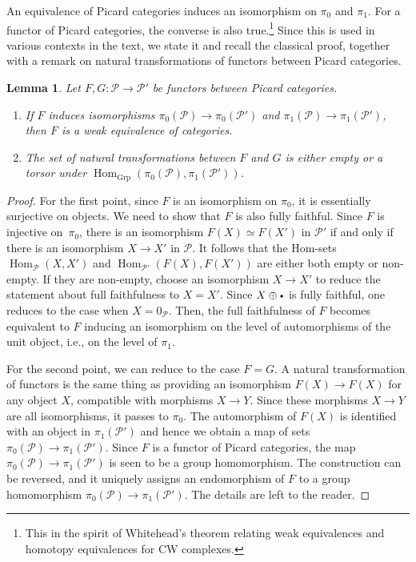 \documentclass[11pt]{article}
\newcommand{\ie}{i.e.,\xspace}
\newcommand{\sbullet}{{\scriptscriptstyle\bullet}}
\newcommand{\csbullet}{{\raisebox{1pt}{$\sbullet$}}}
\theoremstyle{plain}
\newtheorem{lemma}[theorem]{Lemma}
\theoremstyle{definition}
\newcommand{\Pcal}{\mathcal P}
\DeclareMathOperator{\Hom}{Hom}
\begin{document}
An equivalence of Picard categories induces an isomorphism on $\pi_0$ and $\pi_1$. For a functor of Picard categories, the converse is also true.\footnote{This in the spirit of Whitehead's theorem relating weak equivalences and homotopy equivalences for CW complexes.} Since this is used in various contexts in the text, we state it and recall the classical proof, together with a remark on natural transformations of functors between Picard categories.
\begin{lemma}\label{lemma:isoPicard}
Let $F, G: \Pcal \to \Pcal'$ be functors between Picard categories.
\begin{enumerate}
\item If $F$ induces isomorphisms $\pi_0(\Pcal) \to \pi_0(\Pcal')$ and $\pi_1(\Pcal) \to \pi_1(\Pcal')$, then $F$ is a weak equivalence of categories.
\item The set of natural transformations between $F$ and $G$ is either empty or a torsor under $\Hom_{\mathrm{Grp}}(\pi_0(\Pcal), \pi_1(\Pcal'))$.
\end{enumerate}
\end{lemma}
\begin{proof}
For the first point, since $F$ is an isomorphism on $\pi_0$, it is essentially surjective on objects. We need to show that $F$ is also fully faithful. Since $F$ is injective on~$\pi_0$, there is an isomorphism $F(X) \simeq F(X')$ in $\Pcal'$ if and only if there is an isomorphism $X\to X'$ in $\Pcal$. It follows that the Hom-sets $\Hom_{\Pcal}(X,X')$ and $\Hom_{\Pcal'}(F(X), F(X'))$ are either both empty or non-empty. If they are non-empty, choose an isomorphism $X\to X'$ to reduce the statement about full faithfulness to $X=X'$. Since $X\oplus \csbullet$ is fully faithful, one reduces to the case when $X = 0_{\Pcal}$. Then, the full faithfulness of $F$ becomes equivalent to $F$ inducing an isomorphism on the level of automorphisms of the unit object, \ie on the level of $\pi_1$.

For the second point, we can reduce to the case $F=G$. A natural transformation of functors is the same thing as providing an isomorphism $F(X) \to F(X)$ for any object $X$, compatible with morphisms $X\to Y$. Since these morphisms $X\to Y$ are all isomorphisms, it passes to $\pi_0$. The automorphism of $F(X)$ is identified with an object in $\pi_1(\Pcal')$ and hence we obtain a map of sets $\pi_0(\Pcal) \to \pi_1(\Pcal')$. Since $F$ is a functor of Picard categories, the map $\pi_0(\Pcal) \to \pi_1(\Pcal')$ is seen to be a group homomorphism. The construction can be reversed, and it uniquely assigns an endomorphism of $F$ to a group homomorphism $\pi_0(\Pcal) \to \pi_1(\Pcal')$. The details are left to the reader.
\end{proof}
\end{document}
